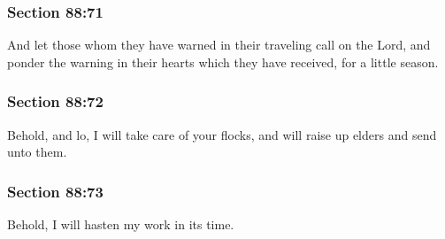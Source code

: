 	\subsubsection{Section 88:71} %
		\label{DC88-71}

		And let those whom they have warned in their traveling call on the Lord, and ponder the warning in their hearts which they have received, for a little season.


	\subsubsection{Section 88:72} %
		\label{DC88-72}

		Behold, and lo, I will take care of your flocks, and will raise up elders and send unto them.


	\subsubsection{Section 88:73} %
		\label{DC88-73}

		Behold, I will hasten my work in its time.


